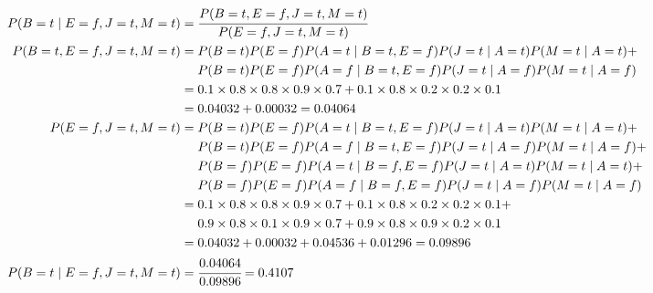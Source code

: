 \documentclass[a4paper]{article}
\theoremstyle{definition}
\newenvironment{soln}{
	\leavevmode\color{blue}\ignorespaces
}{}
\begin{document}
\begin{soln}  
	\begin{align*}
		P(B=t \mid E=f,J=t,M=t)&=\cfrac{P(B=t,E=f,J=t,M=t)}{P(E=f,J=t,M=t)}\\
		P(B=t,E=f,J=t,M=t)&=P(B=t)P(E=f) P(A=t \mid B=t,E=f) P(J=t \mid A=t)P(M=t \mid A=t) + \\
						  &\ \ \ \  P(B=t)P(E=f) P(A=f \mid B=t,E=f) P(J=t \mid A=f)P(M=t \mid A=f)\\
						  &=0.1\times 0.8\times 0.8\times 0.9\times 0.7 + 0.1\times 0.8\times 0.2\times 0.2\times 0.1\\
						  &=0.04032+0.00032=0.04064 \\
		P(E=f,J=t,M=t)&=P(B=t)P(E=f) P(A=t \mid B=t,E=f) P(J=t \mid A=t)P(M=t \mid A=t) + \\
					  &\ \ \ \  P(B=t)P(E=f) P(A=f \mid B=t,E=f) P(J=t \mid A=f)P(M=t \mid A=f) + \\
					  &\ \ \ \  P(B=f)P(E=f) P(A=t \mid B=f,E=f) P(J=t \mid A=t)P(M=t \mid A=t) + \\
					  &\ \ \ \  P(B=f)P(E=f) P(A=f \mid B=f,E=f) P(J=t \mid A=f)P(M=t \mid A=f)\\
					  &=0.1\times 0.8\times 0.8\times 0.9\times 0.7 + 0.1\times 0.8\times 0.2\times 0.2\times 0.1 + \\
					  &\ \ \ \  0.9\times 0.8\times 0.1\times 0.9\times 0.7 + 0.9\times 0.8\times 0.9\times 0.2\times 0.1\\
					  &=0.04032+0.00032+0.04536+0.01296=0.09896\\
		P(B=t \mid E=f,J=t,M=t)&=\cfrac{0.04064}{0.09896}=0.4107
	\end{align*}
	

\end{soln}
\end{document}

